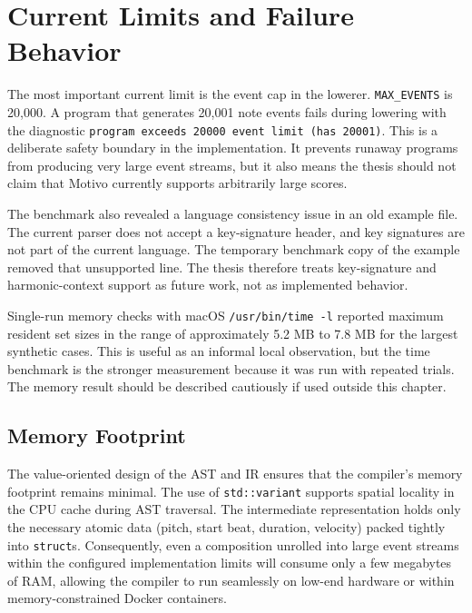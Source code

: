 \section{Current Limits and Failure Behavior}\label{sec:limits}

The most important current limit is the event cap in the lowerer.
\texttt{MAX\_EVENTS} is 20,000.
A program that generates 20,001 note events fails during lowering with the diagnostic
\texttt{program exceeds 20000 event limit (has 20001)}.
This is a deliberate safety boundary in the implementation.
It prevents runaway programs from producing very large event streams, but it also means the thesis should not claim that
Motivo currently supports arbitrarily large scores.

The benchmark also revealed a language consistency issue in an old example file.
The current parser does not accept a key-signature header, and key signatures are not part of the current language.
The temporary benchmark copy of the example removed that unsupported line.
The thesis therefore treats key-signature and harmonic-context support as future work, not as implemented behavior.

Single-run memory checks with macOS \texttt{/usr/bin/time -l} reported maximum resident set sizes in the range of
approximately 5.2 MB to 7.8 MB for the largest synthetic cases.
This is useful as an informal local observation, but the time benchmark is the stronger measurement because it was run
with repeated trials.
The memory result should be described cautiously if used outside this chapter.

\subsection{Memory Footprint}\label{detail-subsec:memory-footprint}

The value-oriented design of the AST and IR ensures that the compiler's memory footprint remains minimal.
The use of \texttt{std::variant} supports spatial locality in the CPU cache during AST traversal.
The intermediate representation holds only the necessary atomic data (pitch, start beat, duration, velocity) packed
tightly into \texttt{struct}s. Consequently, even a composition unrolled into large event streams within the
configured implementation limits will consume only a few
megabytes of RAM, allowing the compiler to run seamlessly on low-end hardware or within memory-constrained Docker
containers.
